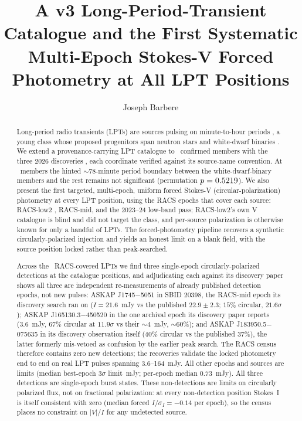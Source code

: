 \documentclass[twocolumn]{aastex631}
\begin{document}
\title{A v3 Long-Period-Transient Catalogue and the First Systematic Multi-Epoch
Stokes-V Forced Photometry at All LPT Positions}
\author[0009-0008-3289-4447]{Joseph Barbere}

\begin{abstract}
Long-period radio transients (LPTs) are sources pulsing on minute-to-hour periods
\citep{hurleywalker2022,caleb2024}, a young class whose proposed progenitors span neutron
stars and white-dwarf binaries \citep{rea2026}. We extend a provenance-carrying LPT
catalogue to \lvNLpt\ confirmed members with the three 2026 discoveries
\citep{pritchard2026,vaster2026}, each coordinate verified against its source-name
convention. At \lvNLpt\ members the hinted $\sim$78-minute period boundary between the
white-dwarf-binary members and the rest remains not significant (permutation
$p = 0.5219$). We also present the first targeted, multi-epoch, uniform forced
Stokes-V (circular-polarization) photometry at every LPT position, using the RACS
\citep{mcconnell2020} epochs that cover each source: RACS-low2 \citep{racslow2}, RACS-mid,
and the 2023--24 low-band pass; RACS-low2's own V catalogue is blind and did not target
the class, and per-source polarization is otherwise known for only a handful of LPTs. The
forced-photometry pipeline recovers a synthetic circularly-polarized injection and
yields an honest limit on a blank field, with the source position locked rather than
peak-searched.

Across the \lvRealNMeasured\ RACS-covered LPTs we find three single-epoch
circularly-polarized detections at the catalogue positions, and adjudicating each against
its discovery paper shows all three are independent re-measurements of already published detection
epochs, not new pulses: ASKAP J1745$-$5051 in SBID 20398, the RACS-mid epoch its
discovery search ran on ($I=21.6$~mJy vs the published $22.9\pm2.3$; $15\%$ circular,
$21.6\sigma$); ASKAP J165130.3$-$450520 in the one archival epoch its discovery paper
reports (3.6~mJy, $67\%$ circular at $11.9\sigma$ vs their $\sim$4~mJy, $\sim$60\%); and
ASKAP J183950.5$-$075635 in its discovery observation itself ($40\%$ circular vs the
published 37\%), the latter formerly mis-vetoed as confusion by the earlier peak search.
The RACS census therefore contains zero new detections; the recoveries validate the
locked photometry end to end on real LPT pulses spanning 3.6--164~mJy. All other epochs
and sources are limits (median best-epoch $3\sigma$ limit \lvRealMedianVLimit\,mJy;
per-epoch median 0.73~mJy). All three detections are single-epoch burst states. These non-detections are limits on
circularly polarized flux, not on fractional polarization: at every non-detection position
Stokes~I is itself consistent with zero (median forced $I/\sigma_I = -0.14$ per epoch), so
the census places no constraint on $|V|/I$ for any undetected source.


\end{abstract}
\end{document}
